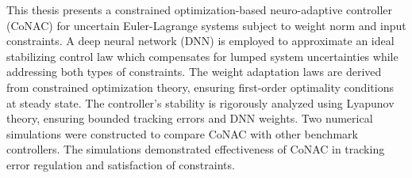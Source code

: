 
This thesis presents a constrained optimization-based neuro-adaptive controller (CoNAC) for uncertain Euler-Lagrange systems subject to weight norm and input constraints. 
A deep neural network (DNN) is employed to approximate an ideal stabilizing control law which compensates for lumped system uncertainties while addressing both types of constraints. 
The weight adaptation laws are derived from constrained optimization theory, ensuring first-order optimality conditions at steady state. 
The controller’s stability is rigorously analyzed using Lyapunov theory, ensuring bounded tracking errors and DNN weights. 
Two numerical simulations were constructed to compare CoNAC with other benchmark controllers.
The simulations demonstrated effectiveness of CoNAC in tracking error regulation and satisfaction of constraints.

